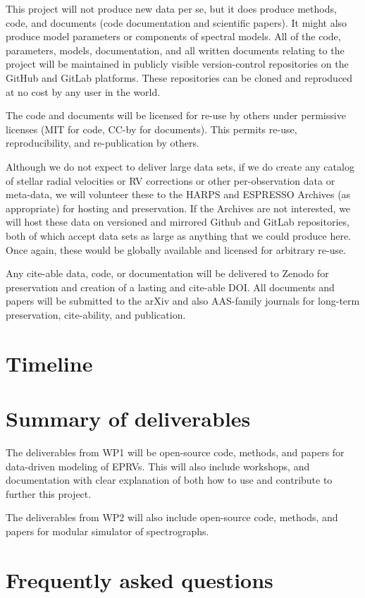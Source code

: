 \documentclass[12pt]{article}
\begin{document}
This project will not produce new data per se, but it does produce methods, code, and documents (code documentation and scientific papers). It might also produce model parameters or components of spectral models. All of the code, parameters, models, documentation, and all written documents relating to the project will be maintained in publicly visible version-control repositories on the GitHub and GitLab platforms. These repositories can be cloned and reproduced at no cost by any user in the world.

The code and documents will be licensed for re-use by others under permissive licenses (MIT for code, CC-by for documents). This permits re-use, reproducibility, and re-publication by others.

Although we do not expect to deliver large data sets, if we do create any catalog of stellar radial velocities or RV corrections or other per-observation data or meta-data, we will volunteer these to the HARPS and ESPRESSO Archives (as appropriate) for hosting and preservation. If the Archives are not interested, we will host these data on versioned and mirrored Github and GitLab repositories, both of which accept data sets as large as anything that we could produce here. Once again, these would be globally available and licensed for arbitrary re-use.

Any cite-able data, code, or documentation will be delivered to Zenodo for preservation and creation of a lasting and cite-able DOI. All documents and papers will be submitted to the arXiv and also AAS-family journals for long-term preservation, cite-ability, and publication.


\section{Timeline}

\section{Summary of deliverables}
The deliverables from WP1 will be open-source code, methods, and papers for data-driven modeling of EPRVs. This will also include workshops, and documentation with clear explanation of both how to use and contribute to further this project.

The deliverables from WP2 will also include open-source code, methods, and papers for modular simulator of spectrographs.

\section{Frequently asked questions}

\clearpage\raggedright %


\end{document}
